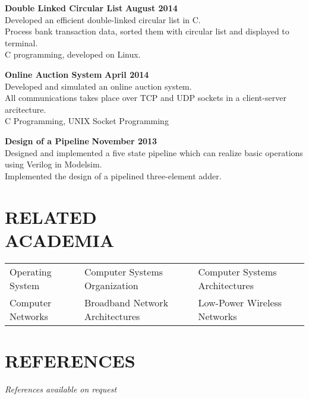 \documentclass[margin,line]{resume}
\begin{document}
\begin{resume}
    \textbf{\listing Double Linked Circular List} \hfill \textbf{August 2014}\vspace{2mm}\\
    Developed an efficient double-linked circular list in C.\\
    Process bank transaction data, sorted them with circular list and displayed to terminal.\\
    C programming, developed on Linux.

    \textbf{\listing Online Auction System} \hfill \textbf{April 2014}\vspace{2mm}\\
    Developed and simulated an online auction system.\\
    All communications takes place over TCP and UDP sockets in a client-server arcitecture.\\
    C Programming, UNIX Socket Programming
    
    \textbf{\listing Design of a Pipeline} \hfill \textbf{November 2013}\vspace{2mm}\\
    Designed and implemented a five state pipeline which can realize basic operations using Verilog in Modelsim.\\
	Implemented the design of a pipelined three-element adder.

\sectionline

    \section{\mysidestyle \textbf{\large{R}\small{ELATED\\ACADEMIA}}} 

	\vspace{1mm} %
	\begin{tabular}{@{}p{4cm}p{5.5cm}p{5.5cm}}
	Operating System     &  Computer Systems Organization        &  Computer Systems Architectures\\
	Computer Networks    &  Broadband Network Architectures      &  Low-Power Wireless Networks
	\end{tabular}
	
\sectionline

\section{\mysidestyle \textbf{\large{R}\small{EFERENCES}}}

    \textsl{References available on request}

\end{resume}
\end{document}

